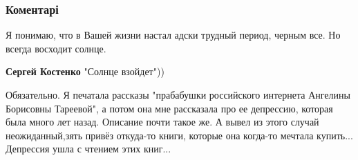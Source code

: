  
 
 
 
 
\subsubsection{Коментарі}

\begin{itemize}
 
Я понимаю, что в Вашей жизни настал адски трудный период, черным все. Но всегда
восходит солнце.

\begin{itemize}
 
\textbf{Сергей Костенко} "Солнце взойдет"))

 

Обязательно. Я печатала рассказы "прабабушки российского интернета Ангелины
Борисовны Тареевой", а потом она мне рассказала про ее депрессию, которая была
много лет назад. Описание почти такое же. А вывел из этого случай
неожиданный,зять привёз откуда-то книги, которые она когда-то мечтала купить...
Депрессия ушла с чтением этих книг...


 

\end{itemize}
\end{itemize}
